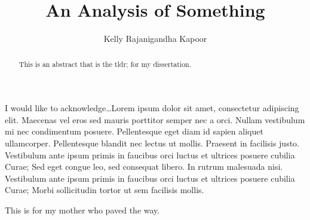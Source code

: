 \documentclass[11pt]{umnthesis}
\title{An Analysis of Something}
\author{Kelly Rajanigandha Kapoor}
\begin{document}
\frenchspacing %



\makesignaturepage %
\maketitlepage %
\makecopyrightpage %



\frontmatter
\pagestyle{empty} %



  \begin{acknowledgements}
    I would like to acknowledge\ldots Lorem ipsum dolor sit amet, consectetur adipiscing elit. Maecenas vel eros sed mauris porttitor semper nec a orci. Nullam vestibulum mi nec condimentum posuere. Pellentesque eget diam id sapien aliquet ullamcorper. Pellentesque blandit nec lectus ut mollis. Praesent in facilisis justo. Vestibulum ante ipsum primis in faucibus orci luctus et ultrices posuere cubilia Curae; Sed eget congue leo, sed consequat libero. In rutrum malesuada nisi. Vestibulum ante ipsum primis in faucibus orci luctus et ultrices posuere cubilia Curae; Morbi sollicitudin tortor ut sem facilisis mollis.
  \end{acknowledgements}



  \begin{dedication}
    This is for my mother who paved the way.
  \end{dedication}



  \begin{abstract}
    This is an abstract that is the tldr; for my dissertation.
  \end{abstract}



\makeatletter
\def\maxwidth{ %
  \ifdim\Gin@nat@width>\linewidth
    \linewidth
  \else
    \Gin@nat@width
  \fi
}
\makeatother

\renewcommand{\contentsname}{Table of Contents}

\setlength{\parskip}{0pt}

\providecommand{\tightlist}{%
  \setlength{\itemsep}{0pt}\setlength{\parskip}{0pt}}
\end{document}
